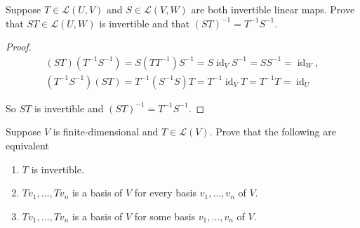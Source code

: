 \begin{exercise}
    Suppose $T\in \mathcal{L}(U, V)$ and $S \in \mathcal{L}(V, W)$ are both invertible linear maps. Prove that $ST\in \mathcal{L}(U, W)$ is invertible and that ${(ST)}^{-1} = T^{-1}S^{-1}$.
\end{exercise}

\begin{proof}
    \[
        \begin{split}
            {(ST)}{(T^{-1}S^{-1})} = S(TT^{-1})S^{-1} = S\operatorname{id}_{V}S^{-1} = SS^{-1} = \operatorname{id}_{W}, \\
            {(T^{-1}S^{-1})(ST)} = T^{-1}(S^{-1}S)T = T^{-1}\operatorname{id}_{V}T = T^{-1}T = \operatorname{id}_{U}
        \end{split}
    \]

    So $ST$ is invertible and ${(ST)}^{-1} = T^{-1}S^{-1}$.
\end{proof}
\newpage

\begin{exercise}\label{chapter3:sectionD:exercise3}
    Suppose $V$ is finite-dimensional and $T \in \mathcal{L}(V)$. Prove that the following are equivalent
    \begin{enumerate}[label={(\alph*)}]
        \item $T$ is invertible.
        \item $Tv_{1}, \ldots, Tv_{n}$ is a basis of $V$ for every basis $v_{1}, \ldots, v_{n}$ of $V$.
        \item $Tv_{1}, \ldots, Tv_{n}$ is a basis of $V$ for some basis $v_{1}, \ldots, v_{n}$ of $V$.
    \end{enumerate}
\end{exercise}

